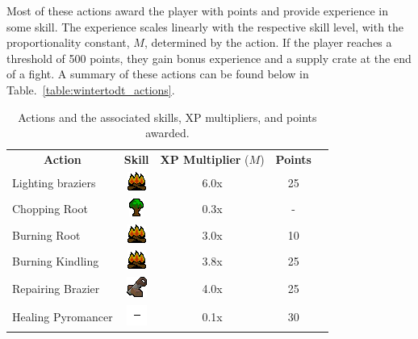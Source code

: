 Most of these actions award the player with points and provide experience in some skill. The experience scales linearly with the respective skill level, with the proportionality constant, $M$, determined by the action. If the player reaches a threshold of 500 points, they gain bonus experience and a supply crate at the end of a fight. A summary of these actions can be found below in Table.~\ref{table:wintertodt_actions}.


\begin{table}[H]
	\caption{Actions and the associated skills, XP multipliers, and points awarded.}
	\centering
	\begin{tabular}{lcccc}
		\multicolumn{1}{c}{\textbf{Action}} & \textbf{Skill}                                                                   & \textbf{XP Multiplier} ($M$) & \textbf{Points} \\
		Lighting braziers                   & \includegraphics[width=0.03\linewidth]{img/general/skills/Firemaking_icon.png}   & 6.0x                     & 25              \\
		Chopping Root                       & \includegraphics[width=0.03\linewidth]{img/general/skills/Woodcutting_icon.png}  & 0.3x                   & -               \\
		Burning Root                        & \includegraphics[width=0.03\linewidth]{img/general/skills/Firemaking_icon.png}   & 3.0x                     & 10              \\
		Burning Kindling                    & \includegraphics[width=0.03\linewidth]{img/general/skills/Firemaking_icon.png}   & 3.8x                   & 25              \\
		Repairing Brazier                   & \includegraphics[width=0.03\linewidth]{img/general/skills/Construction_icon.png} & 4.0x                     & 25              \\
		Healing Pyromancer                  & \includegraphics[width=0.03\linewidth]{img/general/skills/blank.png}             & 0.1x                   & 30              \\

\end{tabular}
\end{table}
